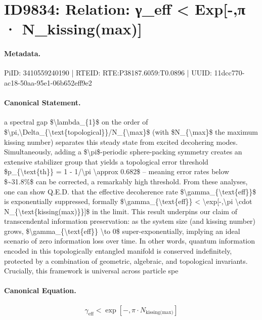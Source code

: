 \section*{ID9834: Relation: γ\_eff < Exp[-,π · N\_kissing(max)]}
\paragraph{Metadata.}
PiID: 3410559240190 | RTEID: RTE:P38187.6059:T0.0896 | UUID: 11dcc770-ac18-50aa-95e1-06b652eff9e2

\paragraph{Canonical Statement.}
a spectral gap \$\textbackslash{}lambda\_\{1\}\$ on the order of \$\textbackslash{}pi,\textbackslash{}Delta\_\{\textbackslash{}text\{topological\}\}/N\_\{\textbackslash{}max\}\$ (with \$N\_\{\textbackslash{}max\}\$ the maximum kissing number) separates this steady state from excited decohering modes. Simultaneously, adding a \$\textbackslash{}pi\$-periodic sphere-packing symmetry creates an extensive stabilizer group that yields a topological error threshold \$p\_\{\textbackslash{}text\{th\}\} = 1 - 1/\textbackslash{}pi \textbackslash{}approx 0.682\$ – meaning error rates below \$\textasciitilde{}31.8\%\$ can be corrected, a remarkably high threshold. From these analyses, one can show Q.E.D. that the effective decoherence rate \$\textbackslash{}gamma\_\{\textbackslash{}text\{eff\}\}\$ is exponentially suppressed, formally \$\textbackslash{}gamma\_\{\textbackslash{}text\{eff\}\} < \textbackslash{}exp[-,\textbackslash{}pi \textbackslash{}cdot N\_\{\textbackslash{}text\{kissing(max)\}\}]\$ in the limit. This result underpins our claim of transcendental information preservation: as the system size (and kissing number) grows, \$\textbackslash{}gamma\_\{\textbackslash{}text\{eff\}\} \textbackslash{}to 0\$ super-exponentially, implying an ideal scenario of zero information loss over time. In other words, quantum information encoded in this topologically entangled manifold is conserved indefinitely, protected by a combination of geometric, algebraic, and topological invariants. Crucially, this framework is universal across particle spe

\paragraph{Canonical Equation.}
\[
\gamma_{\text{eff}} < \exp[-,\pi \cdot N_{\text{kissing(max)}}]
\]


